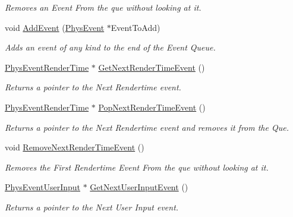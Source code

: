 \begin{DoxyCompactItemize}
\begin{DoxyCompactList}\small\item\em Removes an Event From the que without looking at it. \item\end{DoxyCompactList}\item 
void \hyperlink{classPhysEventManager_a7c9bb46b17f6d9245817a402dc6a2f6f}{AddEvent} (\hyperlink{classPhysEvent}{PhysEvent} $\ast$EventToAdd)
\begin{DoxyCompactList}\small\item\em Adds an event of any kind to the end of the Event Queue. \item\end{DoxyCompactList}\item 
\hyperlink{classPhysEventRenderTime}{PhysEventRenderTime} $\ast$ \hyperlink{classPhysEventManager_a1f2d0506ce816176913e5bdfaa9fd724}{GetNextRenderTimeEvent} ()
\begin{DoxyCompactList}\small\item\em Returns a pointer to the Next Rendertime event. \item\end{DoxyCompactList}\item 
\hyperlink{classPhysEventRenderTime}{PhysEventRenderTime} $\ast$ \hyperlink{classPhysEventManager_ad627925363fdbcff98e0faef204e81e2}{PopNextRenderTimeEvent} ()
\begin{DoxyCompactList}\small\item\em Returns a pointer to the Next Rendertime event and removes it from the Que. \item\end{DoxyCompactList}\item 
void \hyperlink{classPhysEventManager_a56acc075e743921e27284c023b3298ce}{RemoveNextRenderTimeEvent} ()
\begin{DoxyCompactList}\small\item\em Removes the First Rendertime Event From the que without looking at it. \item\end{DoxyCompactList}\item 
\hyperlink{classPhysEventUserInput}{PhysEventUserInput} $\ast$ \hyperlink{classPhysEventManager_a4874a9b1138d2351bf28e527a66c02b8}{GetNextUserInputEvent} ()
\begin{DoxyCompactList}\small\item\em Returns a pointer to the Next User Input event. \item\end{DoxyCompactList}\item 

\end{DoxyCompactItemize}
